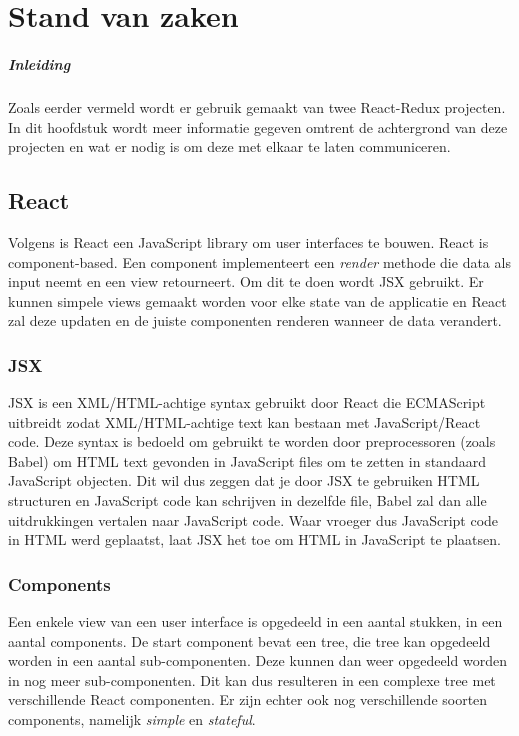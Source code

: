 \chapter{Stand van zaken}
\label{ch:stand-van-zaken}


\paragraph{Inleiding}
Zoals eerder vermeld wordt er gebruik gemaakt van twee React-Redux projecten. In dit hoofdstuk wordt meer informatie gegeven omtrent de achtergrond van deze projecten en wat er nodig is om deze met elkaar te laten communiceren.

\section{React}
Volgens \autocite{React01} is React een JavaScript library om user interfaces te bouwen. React is component-based. Een component implementeert een \textit{render} methode die data als input neemt en een view retourneert. Om dit te doen wordt JSX gebruikt. Er kunnen simpele views gemaakt worden voor elke state van de applicatie en React zal deze updaten en de juiste componenten renderen wanneer de data verandert.

\subsection{JSX}
JSX is een XML/HTML-achtige syntax gebruikt door React die ECMAScript uitbreidt zodat XML/HTML-achtige text kan bestaan met JavaScript/React code. Deze syntax is bedoeld om gebruikt te worden door preprocessoren (zoals Babel) om HTML text gevonden in JavaScript files om te zetten in standaard JavaScript objecten. Dit wil dus zeggen dat je door JSX te gebruiken HTML structuren en JavaScript code kan schrijven in dezelfde file, Babel zal dan alle uitdrukkingen vertalen naar JavaScript code. Waar vroeger dus JavaScript code in HTML werd geplaatst, laat JSX het toe om HTML in JavaScript te plaatsen.
\autocite{jsx}

\subsection{Components}
Een enkele view van een user interface is opgedeeld in een aantal stukken, in een aantal components. De start component bevat een tree, die tree kan opgedeeld worden in een aantal sub-componenten. Deze kunnen dan weer opgedeeld worden in nog meer sub-componenten. Dit kan dus resulteren in een complexe tree met verschillende React componenten. Er zijn echter ook nog verschillende soorten components, namelijk \textit{simple} en \textit{stateful}. 
\autocite{jsx}

